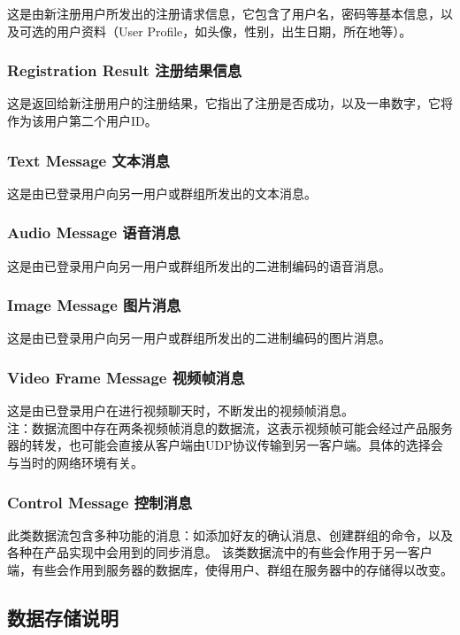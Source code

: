 这是由新注册用户所发出的注册请求信息，它包含了用户名，密码等基本信息，以及可选的用户资料（User Profile，如头像，性别，出生日期，所在地等）。

\subsubsection{Registration Result 注册结果信息}
这是返回给新注册用户的注册结果，它指出了注册是否成功，以及一串数字，它将作为该用户第二个用户ID。

\subsubsection{Text Message 文本消息}
这是由已登录用户向另一用户或群组所发出的文本消息。

\subsubsection{Audio Message 语音消息}
这是由已登录用户向另一用户或群组所发出的二进制编码的语音消息。

\subsubsection{Image Message 图片消息}
这是由已登录用户向另一用户或群组所发出的二进制编码的图片消息。

\subsubsection{Video Frame Message 视频帧消息}
这是由已登录用户在进行视频聊天时，不断发出的视频帧消息。\\
注：数据流图中存在两条视频帧消息的数据流，这表示视频帧可能会经过产品服务器的转发，也可能会直接从客户端由UDP协议传输到另一客户端。具体的选择会与当时的网络环境有关。

\subsubsection{Control Message 控制消息}
此类数据流包含多种功能的消息：如添加好友的确认消息、创建群组的命令，以及各种在产品实现中会用到的同步消息。
该类数据流中的有些会作用于另一客户端，有些会作用到服务器的数据库，使得用户、群组在服务器中的存储得以改变。

\subsection{数据存储说明}
